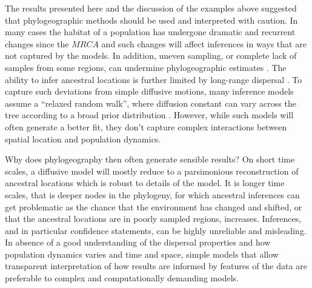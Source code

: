 \documentclass[aps,rmp, twocolumn]{revtex4}
\begin{document}
The results presented here and the discussion of the examples above suggested that phylogeographic methods should be used and interpreted with caution.
In many cases the habitat of a population has undergone dramatic and recurrent changes since the $MRCA$ and such changes will affect inferences in ways that are not captured by the models.
In addition, uneven sampling, or complete lack of samples from some regions, can undermine phylogeographic estimates \citep{kalkauskas_sampling_2021,layan_impact_2023}.
The ability to infer ancestral locations is further limited by long-range dispersal \citep{hallatschek_acceleration_2014}.
To capture such deviations from simple diffusive motions, many inference models assume a ``relaxed random walk'', where diffusion constant can vary across the tree according to a broad prior distribution \citep{dellicour_relax_2021}.
However, while such models will often generate a better fit, they don't capture complex interactions between spatial location and population dynamics.

Why does phylogeography then often generate sensible results?
On short time scales, a diffusive model will mostly reduce to a parsimonious reconstruction of ancestral locations which is robust to details of the model.
It is longer time scales, that is deeper nodes in the phylogeny, for which ancestral inferences can get problematic as the chance that the environment has changed and shifted, or that the ancestral locations are in poorly sampled regions, increases.
Inferences, and in particular confidence statements, can be highly unreliable and misleading.
In absence of a good understanding of the dispersal properties and how population dynamics varies and time and space, simple models that allow transparent interpretation of how results are informed by features of the data are preferable to complex and computationally demanding models.



\end{document}
